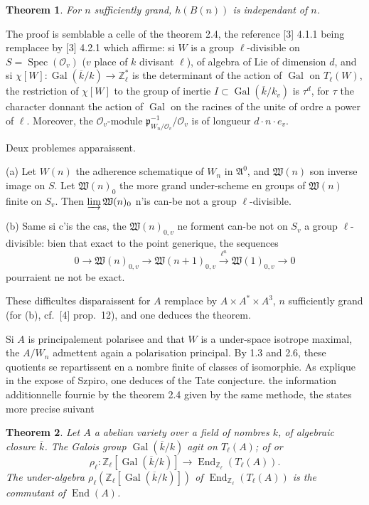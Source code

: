 \documentclass[12pt,a4paper]{article}
\theoremstyle{plain}
\newtheorem{theorem}{Theorem}[section]
\theoremstyle{definition}
\theoremstyle{remark}
\DeclareMathOperator{\Spec}{Spec}
\DeclareMathOperator{\End}{End}
\DeclareMathOperator{\Gal}{Gal}
\newcommand{\ZZ}{\mathbb{Z}}
\newcommand{\cO}{\mathcal{O}}
\newcommand{\fA}{\mathfrak{A}}
\providecommand{\ZZ}{\mathbb{Z}}
\providecommand{\cO}{\mathcal{O}}
\providecommand{\fA}{\mathfrak{A}}
\providecommand{\fW}{\mathfrak{W}}
\providecommand{\End}{\operatorname{End}}
\providecommand{\Gal}{\operatorname{Gal}}
\providecommand{\Spec}{\operatorname{Spec}}
\providecommand{\fp}{\mathfrak{p}}
\begin{document}
\begin{theorem}
For $n$ sufficiently grand, $h(B(n))$ is independant of $n$.
\end{theorem}

The proof is semblable a celle of the theorem 2.4, the reference [3] 4.1.1 being remplacee by [3] 4.2.1 which affirme: si $W$ is a group $\ell$-divisible on $S = \Spec(\cO_v)$ ($v$ place of $k$ divisant $\ell$), of algebra of Lie of dimension $d$, and si $\chi[W] : \Gal(\overline{k}/k) \to \ZZ_\ell^*$ is the determinant of the action of $\Gal$ on $T_\ell(W)$, the restriction of $\chi[W]$ to the group of inertie $I \subset \Gal(\overline{k}/k_v)$ is $\tau^d$, for $\tau$ the character donnant the action of $\Gal$ on the racines of the unite of ordre a power of $\ell$. Moreover, the $\cO_v$-module $\fp_{W_n/\cO_v}^{-1}/\cO_v$ is of longueur $d \cdot n \cdot e_v$.

Deux problemes apparaissent.

(a) Let $W(n)$ the adherence schematique of $W_n$ in $\fA^0$, and $\fW(n)$ son inverse image on $S$. Let $\fW(n)_0$ the more grand under-scheme en groups of $\fW(n)$ finite on $S_v$. Then $\varinjlim \fW(n)_0$ n'is can-be not a group $\ell$-divisible.

(b) Same si c'is the cas, the $\fW(n)_{0,v}$ ne forment can-be not on $S_v$ a group $\ell$-divisible: bien that exact to the point generique, the sequences
\[
0 \to \fW(n)_{0,v} \to \fW(n+1)_{0,v} \xrightarrow{\ell^n} \fW(1)_{0,v} \to 0
\]
pourraient ne not be exact.

These difficultes disparaissent for $A$ remplace by $A \times A^{*} \times A^3$, $n$ sufficiently grand (for (b), cf.~[4] prop.~12), and one deduces the theorem.

Si $A$ is principalement polarisee and that $W$ is a under-space isotrope maximal, the $A/W_n$ admettent again a polarisation principal. By 1.3 and 2.6, these quotients se repartissent en a nombre finite of classes of isomorphie. As explique in the expose of Szpiro, one deduces of the Tate conjecture. the information additionnelle fournie by the theorem 2.4 given by the same methode, the states more precise suivant

\begin{theorem}
Let $A$ a abelian variety over a field of nombres $k$, of algebraic closure $\overline{k}$. The Galois group $\Gal(\overline{k}/k)$ agit on $T_\ell(A)$; of or
\[
\rho_\ell : \ZZ_\ell[\Gal(\overline{k}/k)] \longrightarrow \End_{\ZZ_\ell}(T_\ell(A)).
\]
The under-algebra $\rho_\ell(\ZZ_\ell[\Gal(\overline{k}/k)])$ of $\End_{\ZZ_\ell}(T_\ell(A))$ is the commutant of $\End(A)$.
\end{theorem}
\end{document}
